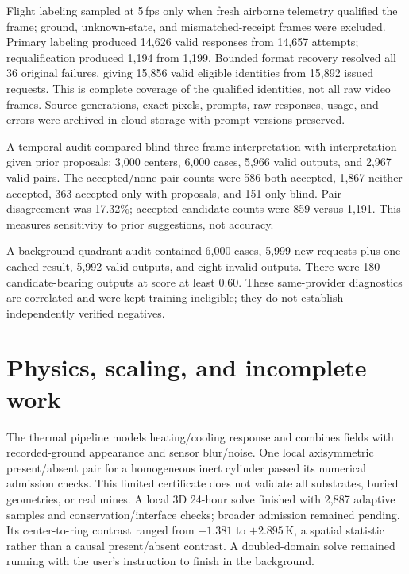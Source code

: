 \documentclass[10pt,a4paper,twocolumn]{article}
\begin{document}
\begin{table}[ht]\centering\small\caption{Prompt/thinking ablation. RPC seconds measure completed request latency, not end-to-end throughput.}\label{tab:thinking}\end{table}

Flight labeling sampled at 5\,fps only when fresh airborne telemetry qualified the frame; ground, unknown-state, and mismatched-receipt frames were excluded. Primary labeling produced 14,626 valid responses from 14,657 attempts; requalification produced 1,194 from 1,199. Bounded format recovery resolved all 36 original failures, giving 15,856 valid eligible identities from 15,892 issued requests. This is complete coverage of the qualified identities, not all raw video frames. Source generations, exact pixels, prompts, raw responses, usage, and errors were archived in cloud storage with prompt versions preserved.

A temporal audit compared blind three-frame interpretation with interpretation given prior proposals: 3,000 centers, 6,000 cases, 5,966 valid outputs, and 2,967 valid pairs. The accepted/none pair counts were 586 both accepted, 1,867 neither accepted, 363 accepted only with proposals, and 151 only blind. Pair disagreement was 17.32\%; accepted candidate counts were 859 versus 1,191. This measures sensitivity to prior suggestions, not accuracy.

A background-quadrant audit contained 6,000 cases, 5,999 new requests plus one cached result, 5,992 valid outputs, and eight invalid outputs. There were 180 candidate-bearing outputs at score at least 0.60. These same-provider diagnostics are correlated and were kept training-ineligible; they do not establish independently verified negatives.

\section{Physics, scaling, and incomplete work}
The thermal pipeline models heating/cooling response and combines fields with recorded-ground appearance and sensor blur/noise. One local axisymmetric present/absent pair for a homogeneous inert cylinder passed its numerical admission checks. This limited certificate does not validate all substrates, buried geometries, or real mines. A local 3D 24-hour solve finished with 2,887 adaptive samples and conservation/interface checks; broader admission remained pending. Its center-to-ring contrast ranged from $-1.381$ to $+2.895$\,K, a spatial statistic rather than a causal present/absent contrast. A doubled-domain solve remained running with the user's instruction to finish in the background.
\end{document}
